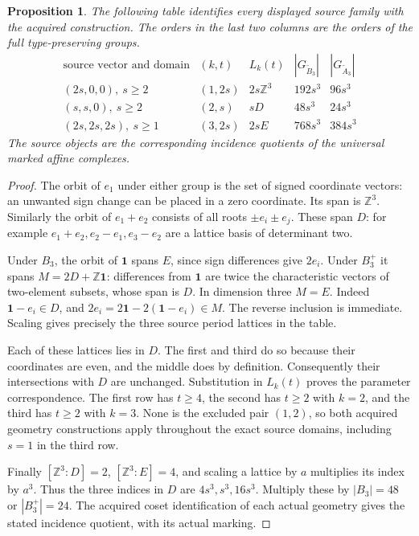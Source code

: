 \documentclass[11pt,a4paper]{article}
\newtheorem{proposition}{Proposition}
\newcommand{\Z}{\mathbb Z}
\newcommand{\one}{\mathbf 1}
\begin{document}
\begin{proposition}
The following table identifies every displayed source family with the
acquired construction. The orders in the last two columns are the orders
of the full type-preserving groups.
\[
\begin{array}{c|c|c|c|c}
 \text{source vector and domain}&(k,t)&L_k(t)&
 |G_{\widetilde B_3}|&|G_{\widetilde A_3}|\\\hline
 (2s,0,0),\ s\ge2&(1,2s)&2s\Z^3&192s^3&96s^3\\
 (s,s,0),\ s\ge2&(2,s)&sD&48s^3&24s^3\\
 (2s,2s,2s),\ s\ge1&(3,2s)&2sE&768s^3&384s^3
\end{array}
\]
The source objects are the corresponding incidence quotients of the
universal marked affine complexes.
\end{proposition}
\begin{proof}
The orbit of $e_1$ under either group is the set of signed coordinate
vectors: an unwanted sign change can be placed in a zero coordinate.
Its span is $\Z^3$. Similarly the orbit of $e_1+e_2$ consists of all
roots $\pm e_i\pm e_j$. These span $D$: for example
$e_1+e_2,e_2-e_1,e_3-e_2$ are a lattice basis of determinant two.

Under $B_3$, the orbit of $\one$ spans $E$, since sign differences
give $2e_i$. Under $B_3^+$ it spans
$M=2D+\Z\one$: differences from $\one$ are twice the
characteristic vectors of two-element subsets, whose span is $D$.
In dimension three $M=E$. Indeed $\one-e_i\in D$, and
$2e_i=2\one-2(\one-e_i)\in M$. The reverse inclusion is immediate.
Scaling gives precisely the three source period lattices in the table.

Each of these lattices lies in $D$. The first and third do so because
their coordinates are even, and the middle does by definition.
Consequently their intersections with $D$ are unchanged. Substitution
in $L_k(t)$ proves the parameter correspondence. The first row has
$t\ge4$, the second has $t\ge2$ with $k=2$, and the third has
$t\ge2$ with $k=3$. None is the excluded pair $(1,2)$, so both
acquired geometry constructions apply throughout the exact source
domains, including $s=1$ in the third row.

Finally $[\Z^3:D]=2$, $[\Z^3:E]=4$, and scaling a lattice by $a$
multiplies its index by $a^3$. Thus the three indices in $D$ are
$4s^3,s^3,16s^3$. Multiply these by $|B_3|=48$ or
$|B_3^+|=24$. The acquired coset identification of each actual
geometry gives the stated incidence quotient, with its actual marking.
\end{proof}
\end{document}
